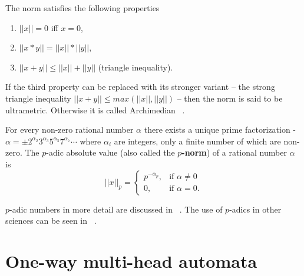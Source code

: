 \documentclass{llncs}
\begin{document}
The norm satisfies the following properties
\begin{enumerate}
\item $||x||=0$ iff $x=0$,
\item $||x*y|| = ||x||*||y||$,
\item $||x+y|| \leq ||x||+||y||$ (triangle inequality).
\end{enumerate}
If the third property can be replaced with its stronger variant -- the strong triangle inequality %
$||x+y|| \leq max(||x||,||y||)$ -- then the norm is said to be ultrametric. Otherwise it is called Archimedian ~\citep{Freivalds2012}.

\begin{definition}
For every non-zero rational number $\alpha$ there exists a unique prime factorization - $\alpha = \pm 2^{\alpha_2}3^{\alpha_3}5^{\alpha_5}7^{\alpha_7} \cdots$ where $\alpha_i$ are integers, only a finite number of which are non-zero.  The $p$-adic absolute value (also called the \textbf{$p$-norm}) of a rational number $\alpha$ is 
\[
||x||_p = \begin{cases}
p^{-\alpha_p}, &\textrm{if } \alpha \neq 0 \\
0, &\textrm{if } \alpha = 0.
\end{cases}
\]
\end{definition}

$p$-adic numbers in more detail are discussed in ~\citep{Madore}. The use of $p$-adics in other sciences can be seen in ~\citep{V.S.Vladimirov1995,Kozyrev2006,Dragovich2009}.

\chapter{One-way multi-head automata}
\end{document}
